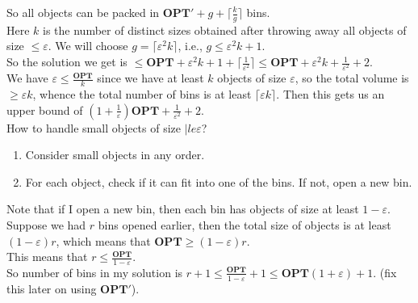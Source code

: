 \documentclass[a4paper]{article}
\newcommand{\nl}{\vspace{0.2cm}\\}
\newcommand{\eps}{\varepsilon}
\newcommand{\OPT}{\mathbf{OPT}}
\begin{document}
So all objects can be packed in $\OPT' + g + \lceil \frac{k}{g} \rceil$ bins.\nl
Here $k$ is the number of distinct sizes obtained after throwing away all objects of size $\le \eps$.
We will choose $g = \lceil \eps^2 k \rceil$, i.e., $g \le \eps^2 k + 1$.\nl
So the solution we get is $\le \OPT + \eps^2 k + 1 + \lceil\frac{1}{\eps^2}\rceil \le \OPT + \eps^2 k + \frac{1}{\eps^2} + 2$.\nl
We have $\eps \le \frac{\OPT}{k}$ since we have at least $k$ objects of size $\eps$, so the total volume is $\ge \eps k$, whence the total number of bins is at least $\lceil \eps k \rceil$. Then this gets us an upper bound of
$\left(1 + \frac{1}{\eps}\right)\OPT + \frac{1}{\eps^2} + 2$.\nl
How to handle small objects of size $|le \eps$?\nl
\begin{enumerate}
    \item Consider small objects in any order.
    \item For each object, check if it can fit into one of the bins. If not, open a new bin.
\end{enumerate}
Note that if I open a new bin, then each bin has objects of size at least $1 - \eps$. Suppose we had $r$ bins opened earlier, then the total size of objects is at least $(1 - \eps)r$, which
means that $\OPT \ge (1 - \eps) r$.\nl
This means that $r \le \frac{\OPT}{1 - \eps}$.\nl
So number of bins in my solution is $r + 1 \le \frac{\OPT}{1 - \eps} + 1 \le \OPT(1 + \eps) + 1$. (fix this later on using $\OPT'$).\nl
\end{document}
